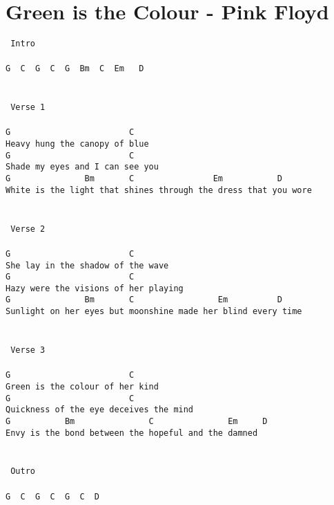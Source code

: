 \newpage
\section{Green is the Colour - Pink Floyd}
\label{Green is the Colour - Pink Floyd}
\texttt{\lbrack\ Intro\rbrack\\
\\
G\ \ C\ \ G\ \ C\ \ G\ \ Bm\ \ C\ \ Em\ \ \ D\\
\\
\\
\lbrack\ Verse\ 1\rbrack\\
\\
G\ \ \ \ \ \ \ \ \ \ \ \ \ \ \ \ \ \ \ \ \ \ \ \ C\\
Heavy\ hung\ the\ canopy\ of\ blue\\
G\ \ \ \ \ \ \ \ \ \ \ \ \ \ \ \ \ \ \ \ \ \ \ \ C\\
Shade\ my\ eyes\ and\ I\ can\ see\ you\\
G\ \ \ \ \ \ \ \ \ \ \ \ \ \ \ Bm\ \ \ \ \ \ \ C\ \ \ \ \ \ \ \ \ \ \ \ \ \ \ \ Em\ \ \ \ \ \ \ \ \ \ \ D\\
White\ is\ the\ light\ that\ shines\ through\ the\ dress\ that\ you\ wore\\
\\
\\
\lbrack\ Verse\ 2\rbrack\\
\\
G\ \ \ \ \ \ \ \ \ \ \ \ \ \ \ \ \ \ \ \ \ \ \ \ C\\
She\ lay\ in\ the\ shadow\ of\ the\ wave\\
G\ \ \ \ \ \ \ \ \ \ \ \ \ \ \ \ \ \ \ \ \ \ \ \ C\\
Hazy\ were\ the\ visions\ of\ her\ playing\\
G\ \ \ \ \ \ \ \ \ \ \ \ \ \ \ Bm\ \ \ \ \ \ \ C\ \ \ \ \ \ \ \ \ \ \ \ \ \ \ \ \ Em\ \ \ \ \ \ \ \ \ \ D\\
Sunlight\ on\ her\ eyes\ but\ moonshine\ made\ her\ blind\ every\ time\\
\\
\\
\lbrack\ Verse\ 3\rbrack\\
\\
G\ \ \ \ \ \ \ \ \ \ \ \ \ \ \ \ \ \ \ \ \ \ \ \ C\\
Green\ is\ the\ colour\ of\ her\ kind\\
G\ \ \ \ \ \ \ \ \ \ \ \ \ \ \ \ \ \ \ \ \ \ \ \ C\\
Quickness\ of\ the\ eye\ deceives\ the\ mind\\
G\ \ \ \ \ \ \ \ \ \ \ Bm\ \ \ \ \ \ \ \ \ \ \ \ \ \ \ C\ \ \ \ \ \ \ \ \ \ \ \ \ \ \ Em\ \ \ \ \ D\\
Envy\ is\ the\ bond\ between\ the\ hopeful\ and\ the\ damned\\
\\
\\
\lbrack\ Outro\rbrack\\
\\
G\ \ C\ \ G\ \ C\ \ G\ \ C\ \ D}
